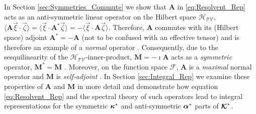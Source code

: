 \documentclass[11pt]{amsart}
\newcommand{\Mb}{\mathbf{M}}
\newcommand{\Ab}{\mathbf{A}}
\newcommand\Kbc{\mbox{\boldmath${\mathcal{K}}$}}
\newcommand{\Tc}{\mathcal{T}}
\newcommand{\Vc}{\mathcal{V}}
\newcommand{\Hs}{\mathscr{H}}
\newcommand{\Fs}{\mathscr{F}}
\newcommand\balpha{\mbox{\boldmath${\alpha}$}}
\newcommand\bkappa{\mbox{\boldmath${\kappa}$}}
\begin{document}
In Section \ref{sec:Symmetries_Commute} we show that $\Ab$ in
\eqref{eq:Resolvent_Rep} acts as an anti-symmetric linear operator on
the Hilbert space $\Hs_{\Tc\Vc}$,
$\langle\Ab\vec{\xi}\cdot\vec{\zeta}\rangle=\langle\vec{\xi}\cdot\Ab^*\vec{\zeta}\rangle=-\langle\vec{\xi}\cdot\Ab\vec{\zeta}\rangle$. Therefore,
$\Ab$ commutes with its (Hilbert space) adjoint $\Ab^*=-\Ab$ (not to
be confused with an effective tensor) and is therefore an example of a
\emph{normal} operator \cite{Stone:64}. Consequently, due to the
sesquilinearity of the $\Hs_{\Tc\Vc}$-inner-product, $\Mb=-\imath\Ab$ acts
as a \emph{symmetric} operator, $\Mb^*=\Mb$
\cite{Reed-1980,Stone:64}. Moreover, on the function space $\Fs$,
$\Ab$ is a \emph{maximal} normal operator and $\Mb$ is
\emph{self-adjoint} \cite{Stone:64}. In Section \ref{sec:Integral_Rep}
we examine these properties of $\Ab$ and $\Mb$ in more detail and
demonstrate how equation \eqref{eq:Resolvent_Rep} and the spectral
theory of such operators lead to integral representations for the
symmetric $\bkappa^*$ and anti-symmetric $\balpha^*$ parts of $\Kbc^*$.      
\end{document}
